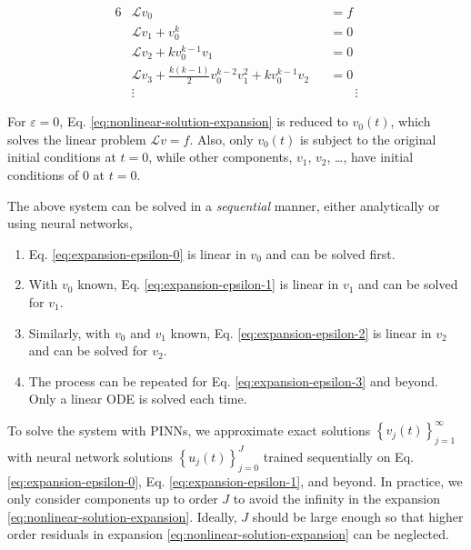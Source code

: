 \documentclass[accepted]{uai2023}
\renewcommand{\L}{\mathcal{L}}
\begin{document}
    {
        \small
        \begin{alignat}{6}
            &\L v_0 &&= f \label{eq:expansion-epsilon-0}\\
            &\L v_1 + v_0^k &&= 0 \label{eq:expansion-epsilon-1}\\
            &\L v_2 + k v_0^{k-1}v_1 &&= 0 \label{eq:expansion-epsilon-2} \\
            &\L v_3 + \frac{k(k-1)}{2} v_0^{k-2}v_1^2 + k v_0^{k-1}v_2 &&= 0 \label{eq:expansion-epsilon-3} \\[-1em]
            &\vdots &&\phantom{=}\,\,\,\,\vdots\nonumber
        \end{alignat}
    }

    \vspace{-1em}
    For $\varepsilon = 0$, Eq. \ref{eq:nonlinear-solution-expansion} is reduced to $v_0(t)$, which solves the linear problem $\L v=f$. 
    Also, only $v_0(t)$ is subject to the original initial conditions at $t=0$, while other components, $v_1$, $v_2$, \dots, have initial conditions of $0$ at $t=0$.

    \begingroup
        \setlength{\itemsep}{0pt}
        \setlength{\parskip}{0pt}
        The above system can be solved in a \textit{sequential} manner, either analytically or using neural networks,
        \begin{enumerate}
            \item \vspace{-0.25em}Eq. \ref{eq:expansion-epsilon-0} is linear in $v_0$ and can be solved first. 
            \item \vspace{-0.25em}With $v_0$ known, Eq. \ref{eq:expansion-epsilon-1} is linear in $v_1$ and can be solved for $v_1$. 
            \item \vspace{-0.25em}Similarly, with $v_0$ and $v_1$ known, Eq. \ref{eq:expansion-epsilon-2} is linear in $v_2$ and can be solved for $v_2$.
            \item \vspace{-0.25em}The process can be repeated for Eq. \ref{eq:expansion-epsilon-3} and beyond. Only a linear ODE is solved each time.
        \end{enumerate}
        To solve the system with PINNs, we approximate exact solutions $\left\{v_j(t)\right\}_{j=1}^{\infty}$ with neural network solutions $\left\{u_j(t)\right\}_{j=0}^{J}$ trained sequentially on Eq. \ref{eq:expansion-epsilon-0}, Eq. \ref{eq:expansion-epsilon-1}, and beyond. 
        In practice, we only consider components up to order $J$ to avoid the infinity in the expansion \ref{eq:nonlinear-solution-expansion}. 
        Ideally, $J$ should be large enough so that higher order residuals in expansion \ref{eq:nonlinear-solution-expansion} can be neglected.
    \endgroup
\end{document}
